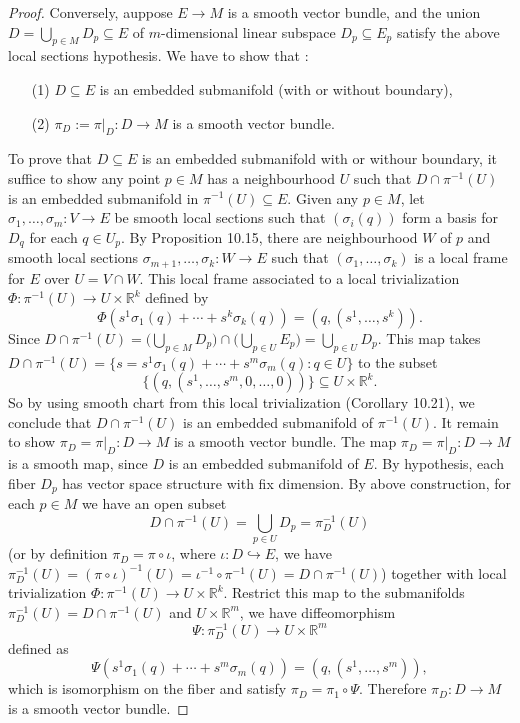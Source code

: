 \documentclass[a4paper]{article}
\theoremstyle{remark}
\newcommand{\rk}{\mathbb{R}^k} %
\newcommand{\subhim}{\subseteq} %
\begin{document}
\begin{proof}
Conversely, auppose $E \to M$ is a smooth vector bundle, and the union $D = \bigcup_{p \in M} D_p \subhim E$ of $m$-dimensional linear subspace $D_p \subhim E_p$ satisfy the above local sections hypothesis. We have to show that :
\begin{enumerate}[nolistsep]
\item[(1)] $D \subhim E$ is an embedded submanifold (with or without boundary),
\item[(2)] $\pi_D := \pi|_D : D \to M$ is a smooth vector bundle.
\end{enumerate}
To prove that $D \subhim E$ is an embedded submanifold with or withour boundary, it suffice to show any point $p \in M$ has a neighbourhood $U$ such that $D  \cap\pi^{-1}(U)$ is an embedded submanifold in $\pi^{-1}(U) \subhim E$. Given any $p \in M$, let $\sigma_1, \dots, \sigma_m : V \to E$ be smooth local sections such that $(\sigma_i(q))$ form a basis for $D_q$ for each $q \in U_p$. By Proposition 10.15, there are neighbourhood $W$ of $p$ and smooth local sections $\sigma_{m+1},\dots,\sigma_k : W \to E$ such that $(\sigma_1,\dots,\sigma_k)$ is a local frame for $E$ over $U= V \cap W$. This local frame associated to a local trivialization $\Phi :\pi^{-1}(U) \to U \times \rk$ defined by 
$$
\Phi(s^1 \sigma_1(q) + \cdots + s^k \sigma_k(q) ) = (q, (s^1 ,\dots, s^k) ).
$$
Since $D \cap  \pi^{-1}(U) = \big(\bigcup_{p \in M} D_p \big) \cap \big(\bigcup_{p \in U} E_p\big) = \bigcup_{p \in U} D_p$. This map takes $D \cap \pi^{-1}(U) = \{s = s^1 \sigma_1(q)+ \cdots + s^m \sigma_m(q) : q \in U \}$ to the subset
$$
\{ (q, (s^1, \dots, s^m, 0,\dots,0) ) \} \subhim  U \times \rk.
$$
So by using smooth chart from this local trivialization (Corollary 10.21), we conclude that $D \cap \pi^{-1}(U)$ is an embedded submanifold of $\pi^{-1}(U)$. It remain to show $\pi_D = \pi|_D : D \to M$ is a smooth vector bundle. The map $\pi_D = \pi|_D : D \to M$ is a smooth map, since $D$ is an embedded submanifold of $E$. By hypothesis, each fiber $D_p$ has vector space structure with fix dimension. By above construction, for each $p \in M$ we have an open subset 
$$
D \cap \pi^{-1}(U) = \bigcup_{p \in U} D_p = \pi_D^{-1}(U)
$$
(or by definition $\pi_D = \pi \circ \iota$, where $\iota : D \hookrightarrow E$, we have $\pi_D^{-1}(U) = (\pi \circ \iota)^{-1}(U) = \iota^{-1} \circ \pi^{-1} (U) = D \cap \pi^{-1} (U)$) together with local trivialization $\Phi : \pi^{-1}(U) \to U \times \rk$. Restrict this map to the submanifolds $ \pi_D^{-1}(U) = D\cap \pi^{-1}(U)$ and $U \times \mathbb{R}^m$, we have diffeomorphism
$$
\Psi : \pi_D^{-1}(U) \to U \times \mathbb{R}^m
$$  
defined as 
$$
\Psi ( s^1 \sigma_1(q)+ \cdots + s^m \sigma_m(q)) = (q, (s^1, \dots, s^m)),
$$
which is isomorphism on the fiber and satisfy $\pi_D = \pi_1 \circ \Psi$. Therefore $\pi_D : D \to M$ is a smooth vector bundle.
\end{proof}
\end{document}
